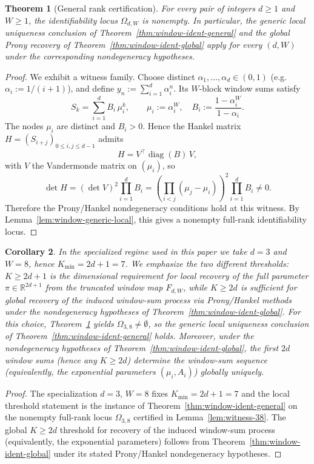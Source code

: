 \documentclass[11pt,reqno]{amsart}
\newtheorem{theorem}{Theorem}[section]
\newtheorem{corollary}[theorem]{Corollary}
\theoremstyle{definition}
\theoremstyle{remark}
\newcommand{\R}{\mathbb{R}}
\newcommand{\1}{\mathbf{1}}
\begin{document}
\begin{theorem}[General rank certification]\label{thm:general-rank}
For every pair of integers $d\ge 1$ and $W\ge 1$, the identifiability locus
$\Omega_{d,W}$ is nonempty.
In particular, the generic local uniqueness conclusion of Theorem~\ref{thm:window-ident-general}
and the global Prony recovery of Theorem~\ref{thm:window-ident-global} apply for every $(d,W)$ under the corresponding nondegeneracy hypotheses.
\end{theorem}

\begin{proof}
We exhibit a witness family.
Choose distinct $\alpha_1,\dots,\alpha_d\in(0,1)$ (e.g.\ $\alpha_i:=1/(i+1)$), and define
$y_n:=\sum_{i=1}^d \alpha_i^n$.
Its $W$-block window sums satisfy
\[
S_k=\sum_{i=1}^d B_i\,\mu_i^k,\qquad
\mu_i:=\alpha_i^W,\quad
B_i:=\frac{1-\alpha_i^W}{1-\alpha_i}.
\]
The nodes $\mu_i$ are distinct and $B_i>0$.
Hence the Hankel matrix $H=(S_{i+j})_{0\le i,j\le d-1}$ admits
\[
H=V^\top\!\operatorname{diag}(B)\,V,
\]
with $V$ the Vandermonde matrix on $(\mu_i)$, so
\[
\det H=(\det V)^2\prod_{i=1}^d B_i
=\left(\prod_{i<j}(\mu_j-\mu_i)\right)^2\prod_{i=1}^d B_i\neq 0.
\]
Therefore the Prony/Hankel nondegeneracy conditions hold at this witness.
By Lemma~\ref{lem:window-generic-local}, this gives a nonempty full-rank identifiability locus.
\end{proof}


\begin{corollary}\label{cor:window-ident-38}
In the specialized regime used in this paper we take $d=3$ and $W=8$, hence $K_{\min}=2d+1=7$.
We emphasize the two different thresholds: $K\ge 2d+1$ is the dimensional requirement for \emph{local} recovery of the full parameter $\pi\in\R^{2d+1}$ from the truncated window map $F_{d,W}$, while $K\ge 2d$ is sufficient for \emph{global} recovery of the induced window-sum process via Prony/Hankel methods under the nondegeneracy hypotheses of Theorem~\ref{thm:window-ident-global}.
For this choice, Theorem~\ref{thm:general-rank} yields $\Omega_{3,8}\neq\emptyset$, so the generic local uniqueness conclusion of
Theorem~\ref{thm:window-ident-general} holds. Moreover, under the nondegeneracy hypotheses of Theorem~\ref{thm:window-ident-global}, the first $2d$ window sums (hence any $K\ge 2d$) determine the window-sum sequence (equivalently, the exponential parameters $(\mu_i,A_i)$) \emph{globally} uniquely.
\end{corollary}

\begin{proof}
The specialization $d=3$, $W=8$ fixes $K_{\min}=2d+1=7$ and the local threshold statement is the
instance of Theorem~\ref{thm:window-ident-general} on the nonempty full-rank locus $\Omega_{3,8}$
certified in Lemma~\ref{lem:witness-38}.
The global $K\ge 2d$ threshold for recovery of the induced window-sum process (equivalently, the exponential parameters)
follows from Theorem~\ref{thm:window-ident-global} under its stated Prony/Hankel nondegeneracy hypotheses.
\end{proof}
\end{document}
